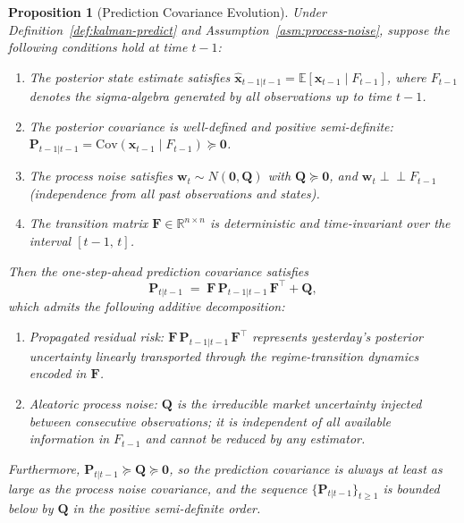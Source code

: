 \documentclass[12pt,openany]{book}
\numberwithin{equation}{chapter}
\theoremstyle{plain}
\newtheorem{proposition}[theorem]{Proposition}
\theoremstyle{definition}
\theoremstyle{remark}
\def\mathcal#1{#1}%
\begin{document}
\begin{proposition}[Prediction Covariance Evolution]
\label{prop:predict-cov}
Under Definition~\ref{def:kalman-predict} and
Assumption~\ref{asm:process-noise}, suppose the following
conditions hold at time $t-1$:
\begin{enumerate}
  \item The posterior state estimate satisfies
        $\hat{\mathbf{x}}_{t-1|t-1}
         = \mathbb{E}[\mathbf{x}_{t-1} \mid \mathcal{F}_{t-1}]$,
        where $\mathcal{F}_{t-1}$ denotes the sigma-algebra
        generated by all observations up to time $t-1$.
  \item The posterior covariance is well-defined and
        positive semi-definite:
        $\mathbf{P}_{t-1|t-1}
         = \mathrm{Cov}(\mathbf{x}_{t-1} \mid \mathcal{F}_{t-1})
         \succeq \mathbf{0}$.
  \item The process noise satisfies
        $\mathbf{w}_t \sim \mathcal{N}(\mathbf{0}, \mathbf{Q})$
        with $\mathbf{Q} \succeq \mathbf{0}$, and
        $\mathbf{w}_t \perp\!\!\!\perp \mathcal{F}_{t-1}$
        (independence from all past observations and states).
  \item The transition matrix $\mathbf{F} \in \mathbb{R}^{n \times n}$
        is deterministic and time-invariant over the interval
        $[t-1,\, t]$.
\end{enumerate}
Then the one-step-ahead prediction covariance satisfies
\begin{equation}
  \mathbf{P}_{t|t-1}
  \;=\;
  \mathbf{F}\,\mathbf{P}_{t-1|t-1}\,\mathbf{F}^\top
  + \mathbf{Q},
  \label{eq:cov-evolution}
\end{equation}
which admits the following additive decomposition:
\begin{enumerate}
  \item \emph{Propagated residual risk:}
        $\mathbf{F}\,\mathbf{P}_{t-1|t-1}\,\mathbf{F}^\top$
        represents yesterday's posterior uncertainty linearly
        transported through the regime-transition dynamics
        encoded in $\mathbf{F}$.
  \item \emph{Aleatoric process noise:}
        $\mathbf{Q}$ is the irreducible market uncertainty
        injected between consecutive observations; it is
        independent of all available information in
        $\mathcal{F}_{t-1}$ and cannot be reduced by any
        estimator.
\end{enumerate}
Furthermore, $\mathbf{P}_{t|t-1} \succeq \mathbf{Q} \succeq \mathbf{0}$,
so the prediction covariance is always at least as large as the
process noise covariance, and the sequence
$\{\mathbf{P}_{t|t-1}\}_{t \geq 1}$ is bounded below by
$\mathbf{Q}$ in the positive semi-definite order.
\end{proposition}
\end{document}
